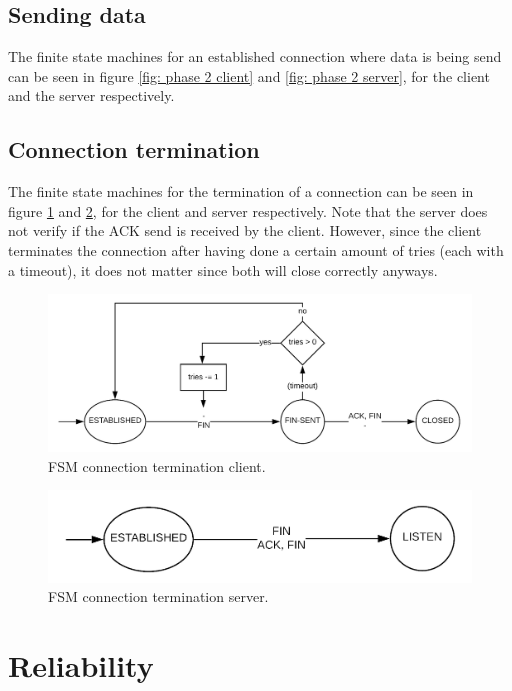 \documentclass[a4paper]{article}
\begin{document}
	\subsection{Sending data}
	The finite state machines for an established connection where data is being send can be seen in figure \ref{fig: phase 2 client} and \ref{fig: phase 2 server}, for the client and the server respectively.

	\subsection{Connection termination}
	The finite state machines for the termination of a connection can be seen in figure \ref{fig: phase 3 client} and \ref{fig: phase 3 server}, for the client and server respectively. Note that the server does not verify if the ACK send is received by the client. However, since the client terminates the connection after having done a certain amount of tries (each with a timeout), it does not matter since both will close correctly anyways.
	\begin{figure}[h]
		\centering
		\includegraphics[width = \textwidth]{phase3_client.png}
		\caption{FSM connection termination client.}
		\label{fig: phase 3 client}
	\end{figure}
	\begin{figure}[h]
		\centering
		\includegraphics[width = .7\textwidth]{phase3_server.png}
		\caption{FSM connection termination server.}
		\label{fig: phase 3 server}
	\end{figure}

\section{Reliability}
\end{document}
